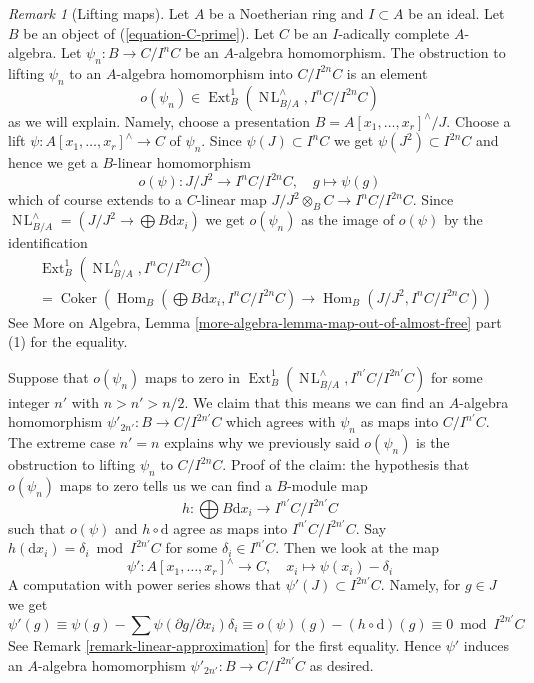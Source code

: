 \documentclass{stacks-project}
\theoremstyle{plain}
\theoremstyle{definition}
\theoremstyle{remark}
\newtheorem{remark}[subsection]{Remark}
\numberwithin{equation}{subsection}
\def\Hom{\mathop{\mathrm{Hom}}\nolimits}
\def\Ext{\mathop{\mathrm{Ext}}\nolimits}
\def\NL{\mathop{N\!L}\nolimits}
\def\Coker{\mathop{\mathrm{Coker}}}
\begin{document}
\begin{remark}[Lifting maps]
\label{remark-improve-homomorphism}
Let $A$ be a Noetherian ring and $I \subset A$ be an ideal.
Let $B$ be an object of (\ref{equation-C-prime}).
Let $C$ be an $I$-adically complete $A$-algebra.
Let $\psi_n : B \to C/I^nC$ be an $A$-algebra homomorphism.
The obstruction to lifting $\psi_n$ to an $A$-algebra
homomorphism into $C/I^{2n}C$ is an element
$$
o(\psi_n) \in \Ext^1_B(\NL_{B/A}^\wedge, I^nC/I^{2n}C)
$$
as we will explain. Namely, choose a presentation
$B = A[x_1, \ldots, x_r]^\wedge/J$.
Choose a lift $\psi : A[x_1, \ldots, x_r]^\wedge \to C$ of $\psi_n$.
Since $\psi(J) \subset I^nC$ we get $\psi(J^2) \subset I^{2n}C$
and hence we get a $B$-linear homomorphism
$$
o(\psi) :
J/J^2 \longrightarrow I^nC/I^{2n}C, \quad g \longmapsto \psi(g)
$$
which of course extends to a $C$-linear map
$J/J^2 \otimes_B C \to I^nC/I^{2n}C$.
Since $\NL_{B/A}^\wedge = (J/J^2 \to \bigoplus B \text{d}x_i)$
we get $o(\psi_n)$ as the image of $o(\psi)$ by the identification
\begin{align*}
& \Ext^1_B(\NL_{B/A}^\wedge, I^nC/I^{2n}C) \\
& =
\Coker\left(\Hom_B(\bigoplus B\text{d}x_i, I^nC/I^{2n}C) \to
\Hom_B(J/J^2, I^nC/I^{2n}C)\right)
\end{align*}
See More on Algebra, Lemma
\ref{more-algebra-lemma-map-out-of-almost-free} part (1) for the equality.

\medskip\noindent
Suppose that $o(\psi_n)$ maps to zero in
$\Ext^1_B(\NL_{B/A}^\wedge, I^{n'}C/I^{2n'}C)$
for some integer $n'$ with $n > n' > n/2$. We claim that this means we can
find an $A$-algebra homomorphism $\psi'_{2n'} : B \to C/I^{2n'}C$
which agrees with $\psi_n$ as maps into $C/I^{n'}C$.
The extreme case $n' = n$ explains why we previously said
$o(\psi_n)$ is the obstruction to lifting $\psi_n$ to $C/I^{2n}C$.
Proof of the claim: the hypothesis that $o(\psi_n)$ maps to zero tells us
we can find a $B$-module map
$$
h : \bigoplus B\text{d}x_i \longrightarrow I^{n'}C/I^{2n'}C
$$
such that $o(\psi)$ and $h \circ \text{d}$ agree as maps
into $I^{n'}C/I^{2n'}C$. Say $h(\text{d}x_i) = \delta_i \bmod I^{2n'}C$
for some $\delta_i \in I^{n'}C$. Then we look at the map
$$
\psi' : A[x_1, \ldots, x_r]^\wedge \to C,\quad
x_i \longmapsto \psi(x_i) - \delta_i
$$
A computation with power series
shows that $\psi'(J) \subset I^{2n'}C$. Namely, for $g \in J$ we get
$$
\psi'(g) \equiv
\psi(g) - \sum \psi(\partial g/\partial x_i)\delta_i \equiv
o(\psi)(g) - (h \circ \text{d})(g) \equiv
0 \bmod I^{2n'}C
$$
See Remark \ref{remark-linear-approximation} for the first equality.
Hence $\psi'$ induces an $A$-algebra homomorphism
$\psi'_{2n'} : B \to C/I^{2n'}C$ as desired.
\end{remark}
\end{document}
